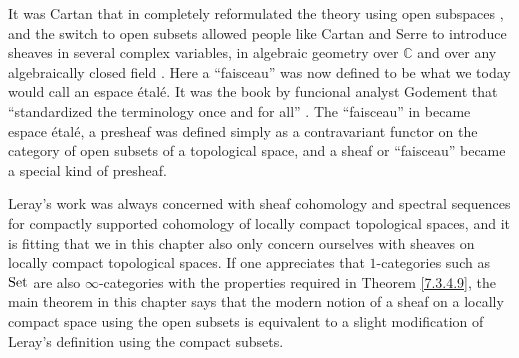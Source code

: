 \documentclass[../../thesis.tex]{subfiles}
\begin{document}
It was Cartan that in \cite{Cartan_50_4} completely reformulated the theory using open subspaces \cite{H.Miller}, and the switch to open subsets allowed people like Cartan and Serre to introduce sheaves in several complex variables, in algebraic geometry over $\mathbb{C}$ and over any algebraically closed field \cite{BorelAMS}.
Here a ``faisceau'' was now defined to be what we today would call an espace étalé.
It was the book \cite{Godement58} by funcional analyst Godement that ``standardized the terminology once and for all'' \cite{Gray}.
The ``faisceau'' in \cite{Cartan_50_4} became espace étalé, a presheaf was defined simply as a contravariant functor on the category of open subsets of a topological space, and a sheaf or ``faisceau'' became a special kind of presheaf.


Leray's work was always concerned with sheaf cohomology and spectral sequences for compactly supported cohomology of locally compact topological spaces, and it is fitting that we in this chapter also only concern ourselves with sheaves on locally compact topological spaces.
If one appreciates that $1$-categories such as $\mathrm{Set}$ are also $\infty$-categories with the properties required in Theorem \ref{7.3.4.9}, the main theorem in this chapter says that the modern notion of a sheaf on a locally compact space using the open subsets is equivalent to a slight modification of Leray's definition using the compact subsets.
\end{document}
